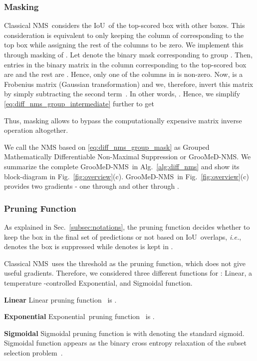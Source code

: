 \documentclass[final]{cvpr}
\newcommand{\myReferFigure}[1]{Fig.~\ref{#1}}
\newcommand{\myReferSection}[1]{Sec.~\ref{#1}}
\newcommand{\methodName}{GrooMeD-NMS}
\newcommand{\iou}{IoU}
\newcommand{\iouTwoD}{\iou}
\newcommand{\basic}{Linear}
\newcommand{\exponentialPruning}{Exponential}
\newcommand{\classicalNmsCaps}{Classical NMS}
\newcommand{\thatIs}{\textit{i.e.}}
\begin{document}
\subsubsection{Masking}
            \classicalNmsCaps~considers the \iouTwoD~of the top-scored box with other boxes. 
            This consideration is equivalent to only keeping the column of  corresponding to the top box while assigning the rest of the columns to be zero. 
            We implement this through masking of . 
            Let  denote the binary mask corresponding to group . 
            Then, entries in the binary matrix  in the column corresponding to the top-scored box are  and the rest are .
            Hence, only one of the columns in  is non-zero. 
            Now,  is a Frobenius matrix (Gaussian transformation) and we, therefore, invert this matrix by simply subtracting the second term~\cite{golub2013matrix}. 
            In other words, . Hence, we simplify \eqref{eq:diff_nms_group_intermediate} further to get
            
            Thus, masking allows to bypass the computationally expensive matrix inverse operation altogether.
            
            We call the NMS based on \eqref{eq:diff_nms_group_mask} as Grouped Mathematically Differentiable Non-Maximal Suppression or \methodName. 
            We summarize the complete \methodName~in Alg.~\ref{alg:diff_nms} and show its block-diagram in \myReferFigure{fig:overview}(c). 
            \methodName~in \myReferFigure{fig:overview}(c) provides two gradients - one through  and other through .

\subsubsection{Pruning Function}\label{sec:pruning}

            As explained in \myReferSection{subsec:notations}, the pruning function  decides whether to keep the box in the final set of predictions  or not based on \iouTwoD~overlaps, \thatIs,  denotes the box  is suppressed while  denotes  is kept in . 
            
            \classicalNmsCaps~uses the threshold as the pruning function, which does not give useful gradients. 
            Therefore, we  considered three different functions for : \basic, a temperature -controlled \exponentialPruning, and Sigmoidal function.
            \begin{compactitem}
                \item \textbf{Linear} Linear pruning function~\cite{bodla2017soft} is .
                \item \textbf{\exponentialPruning} \exponentialPruning~pruning function~\cite{bodla2017soft} is .
                \item \textbf{Sigmoidal} Sigmoidal pruning function is  with  denoting the standard sigmoid. Sigmoidal function appears as the binary cross entropy relaxation of the subset selection problem~\cite{paulus2020gradient}.
            \end{compactitem}
            
\end{document}
